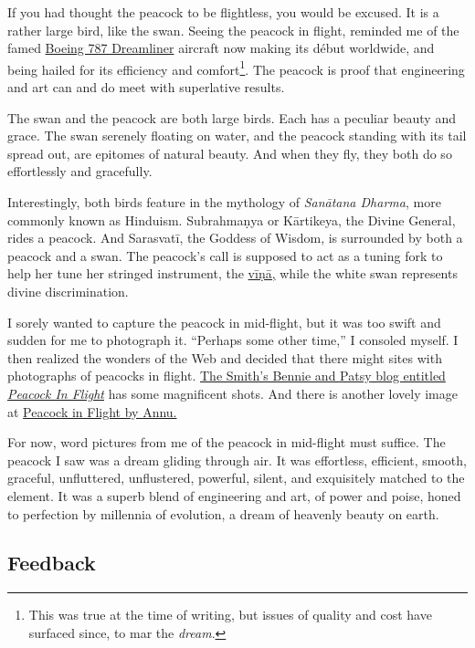 \documentclass[
  a4paper,
]{article}
\begin{document}
If you had thought the peacock to be flightless, you would be excused.
It is a rather large bird, like the swan. Seeing the peacock in flight,
reminded me of the famed
\href{http://www.boeing.com/commercial/787family/background.html}{Boeing
787 Dreamliner} aircraft now making its début worldwide, and being
hailed for its efficiency and comfort\footnote{This was true at the time
  of writing, but issues of quality and cost have surfaced since, to mar
  the \emph{dream}.}. The peacock is proof that engineering and art can
and do meet with superlative results.

The swan and the peacock are both large birds. Each has a peculiar
beauty and grace. The swan serenely floating on water, and the peacock
standing with its tail spread out, are epitomes of natural beauty. And
when they fly, they both do so effortlessly and gracefully.

Interestingly, both birds feature in the mythology of \emph{Sanātana
Dharma}, more commonly known as Hinduism. Subrahmaṇya or Kārtikeya, the
Divine General, rides a peacock. And Sarasvatī, the Goddess of Wisdom,
is surrounded by both a peacock and a swan. The peacock's call is
supposed to act as a tuning fork to help her tune her stringed
instrument, the \href{http://www.thefreedictionary.com/vina}{vīṇā,}
while the white swan represents divine discrimination.

I sorely wanted to capture the peacock in mid-flight, but it was too
swift and sudden for me to photograph it. ``Perhaps some other time,'' I
consoled myself. I then realized the wonders of the Web and decided that
there might sites with photographs of peacocks in flight.
\href{http://bennie-thesmiths.blogspot.in/2012/05/peacock-in-flight.html}{The
Smith's Bennie and Patsy blog entitled \emph{Peacock In Flight}} has
some magnificent shots. And there is another lovely image at
\href{http://www.trekearth.com/gallery/Asia/India/West/Rajasthan/Sujangarh/photo772964.htm}{Peacock
in Flight by Annu.}

For now, word pictures from me of the peacock in mid-flight must
suffice. The peacock I saw was a dream gliding through air. It was
effortless, efficient, smooth, graceful, unfluttered, unflustered,
powerful, silent, and exquisitely matched to the element. It was a
superb blend of engineering and art, of power and poise, honed to
perfection by millennia of evolution, a dream of heavenly beauty on
earth.

\hypertarget{feedback}{%
\subsection{Feedback}\label{feedback}}
\end{document}
